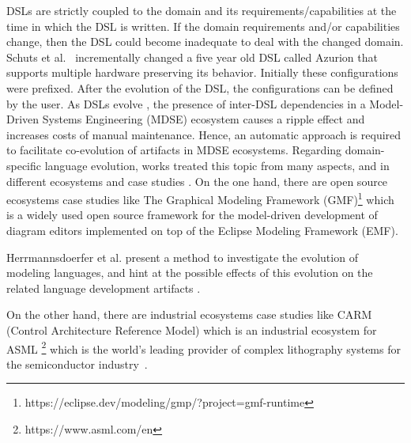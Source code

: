   
  DSLs are strictly coupled to the domain and
  its requirements/capabilities at the time in which the DSL is written. If the domain requirements and/or capabilities change, then the DSL could become inadequate to deal with the changed domain. Schuts et al.~\cite{schuts2021industrial} incrementally changed a five year old DSL called Azurion that supports multiple hardware preserving its behavior. Initially these configurations were prefixed. After the evolution of the DSL, the configurations can be defined by the user. 
 As DSLs evolve \cite{favre2005languages,herrmannsdorfer2013coupled}, the presence of inter-DSL dependencies in a Model-Driven Systems Engineering (MDSE) ecosystem causes a ripple effect and increases costs of manual maintenance. Hence, an automatic approach is required to facilitate co-evolution of artifacts in MDSE ecosystems.
   Regarding domain-specific language evolution, works treated this topic from many aspects, and in different ecosystems and case studies \cite{mengerink2016dsl}.
 On the one hand, there are open source ecosystems case studies like The Graphical Modeling Framework (GMF)\footnote{https://eclipse.dev/modeling/gmp/?project=gmf-runtime} which is a widely used open source framework for the model-driven development of diagram editors implemented on top of the Eclipse Modeling Framework (EMF).
 
  
Herrmannsdoerfer et al. present a method to investigate the evolution of modeling languages, and hint at the possible effects of this evolution on the related language development artifacts  \cite{10.1007/978-3-642-12107-4_3}.
  
    
On the other hand, there are industrial ecosystems case studies like CARM (Control Architecture Reference Model) which is an industrial ecosystem for ASML \footnote{https://www.asml.com/en} which is the world’s leading provider of complex lithography systems for the semiconductor industry~\cite{mengerink2016dsl}.

